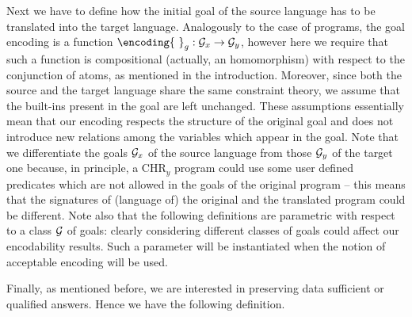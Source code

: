 Next we have to define how the initial goal of the source language has to be translated into the target language. Analogously to the case of programs, the goal encoding is a function $\encoding{\ }_g:{\cal G}_{x} \rightarrow {\cal G}_{y}$, however here we require that such a function is compositional (actually, an homomorphism) with respect to the conjunction of atoms, as mentioned in the introduction. Moreover, since both the source and the target language share the same constraint theory, we assume that the built-ins present in the goal are left unchanged. These assumptions  essentially mean that our encoding respects the structure of the original goal and does not introduce new relations among the variables which appear in the goal.
Note that we differentiate the goals ${\cal G}_{x}$ of the source language from those  ${\cal G}_{y}$ of the target one because, in principle, a CHR$_y$ program could use some user defined predicates which are not allowed in the goals of the original program -- this means that the signatures of (language of) the original and the translated program could be different.
Note also that the following definitions are parametric  with respect to a class ${\cal G}$ of goals: clearly considering different classes of goals could affect our encodability results. Such a parameter will be instantiated when the notion of acceptable encoding will be used.


Finally, as mentioned before, we are interested in preserving data sufficient or qualified answers.  Hence we have the following definition.


